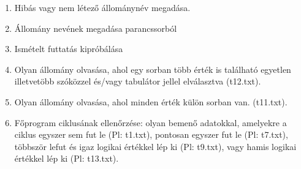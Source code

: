 \documentclass[12pt,a4paper]{article}			%
\begin{document}
		\renewcommand{\labelenumi}{\arabic{enumi}.}
		 \vspace{2mm}
		\begin{enumerate}[1, itemsep=0ex]
			\item Hibás vagy nem létező állománynév megadása.
			\item Állomány nevének megadása parancssorból
			\item Ismételt futtatás kipróbálása
			\item Olyan állomány olvasása, ahol egy sorban több érték is található egyetlen illetvetöbb szóközzel és/vagy tabulátor jellel elválasztva (t12.txt).
			\item Olyan állomány olvasása, ahol minden érték külön sorban van. (t11.txt).
			\item Főprogram ciklusának ellenőrzése: olyan bemenő adatokkal, amelyekre a ciklus egyszer sem fut le (Pl: t1.txt), pontosan egyszer fut le (Pl: t7.txt), többször lefut és igaz logikai értékkel lép ki (Pl: t9.txt), vagy hamis logikai értékkel lép ki (Pl: t13.txt).
		\end{enumerate}
\end{document}
